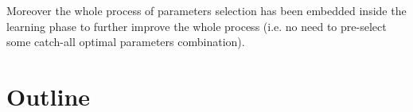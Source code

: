 Moreover the whole process of parameters selection has been embedded inside the
learning phase to further improve the whole process (i.e. no need to pre-select
some catch-all optimal parameters combination).


\section{Outline}


